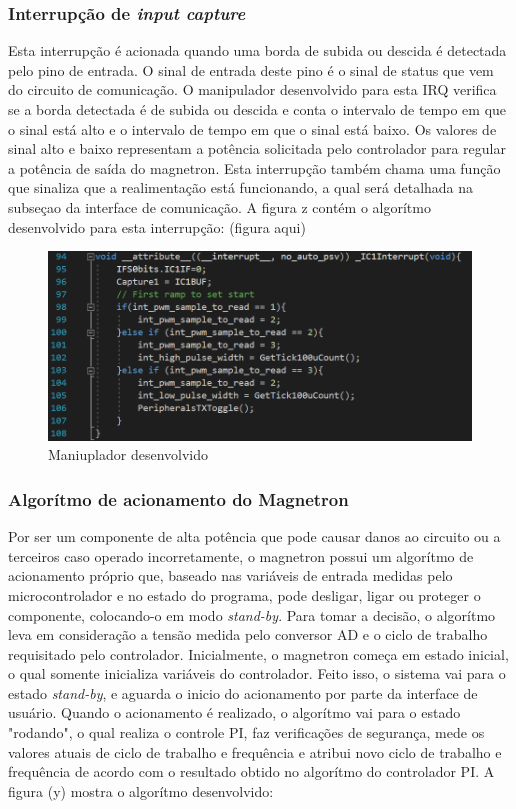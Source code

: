 \subsubsection{Interrupção de \textit{input capture}}
Esta interrupção é acionada quando uma borda de subida ou descida é detectada pelo pino de entrada. O sinal de entrada deste pino é o sinal de status que vem do circuito de comunicação. O manipulador desenvolvido para esta IRQ verifica se a borda detectada é de subida ou descida e conta o intervalo de tempo em que o sinal está alto e o intervalo de tempo em que o sinal está baixo. Os valores de sinal alto e baixo representam a potência solicitada pelo controlador para regular a potência de saída do magnetron. Esta interrupção também chama uma função que sinaliza que a realimentação está funcionando, a qual será detalhada na subseçao da interface de comunicação. A figura z contém o algorítmo desenvolvido para esta interrupção: (figura aqui)

\begin{figure}[H]
    \centering
    \includegraphics[width=1\textwidth]{./dados/figuras/irq_ic}
    \caption{Maniuplador desenvolvido}
    \label{fig:figura-magnetron-usado}
\end{figure}


\subsubsection{Algorítmo de acionamento do Magnetron}
Por ser um componente de alta potência que pode causar danos ao circuito ou a terceiros caso operado incorretamente, o magnetron possui um algorítmo de acionamento próprio que, baseado nas variáveis de entrada medidas pelo microcontrolador e no estado do programa, pode desligar, ligar ou proteger o componente, colocando-o em modo \textit{stand-by}. Para tomar a decisão, o algorítmo leva em consideração a tensão medida pelo conversor AD e o ciclo de trabalho requisitado pelo controlador. Inicialmente, o magnetron começa em estado inicial, o qual somente inicializa variáveis do controlador. Feito isso, o sistema vai para o estado \textit{stand-by}, e aguarda o inicio do acionamento por parte da interface de usuário. Quando o acionamento é realizado, o algorítmo vai para o estado "rodando", o qual realiza o controle PI, faz verificações de segurança, mede os valores atuais de ciclo de trabalho e frequência e atribui novo ciclo de trabalho e frequência de acordo com o resultado obtido no algorítmo do controlador PI. A figura (y) mostra o algorítmo desenvolvido:

